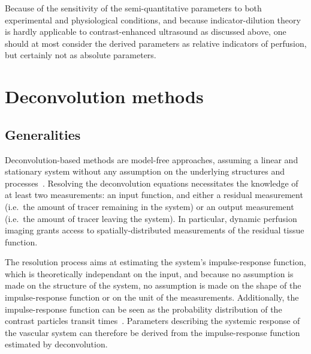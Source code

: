 Because of the sensitivity of the semi-quantitative parameters to both experimental and physiological conditions, and because indicator-dilution theory is hardly applicable to contrast-enhanced ultrasound as discussed above, one should at most consider the derived parameters as relative indicators of perfusion, but certainly not as absolute parameters.

\section{Deconvolution methods}
\label{sec:DeconvolutionMethods}
\subsection{Generalities}
Deconvolution-based methods are model-free approaches, assuming a linear and stationary system without any assumption on the underlying structures and processes~\cite{Lassen:1979tk}.
Resolving the deconvolution equations necessitates the knowledge of at least two measurements: an input function, and either a residual measurement (i.e.~the amount of tracer remaining in the system) or an output measurement (i.e.~the amount of tracer leaving the system).
In particular, dynamic perfusion imaging grants access to spatially-distributed measurements of the residual tissue function.

The resolution process aims at estimating the system's impulse-response function, which is theoretically independant on the input, and because no assumption is made on the structure of the system, no assumption is made on the shape of the impulse-response function or on the unit of the measurements.
Additionally, the impulse-response function can be seen as the probability distribution of the contrast particles transit times~\cite{Lassen:1979vj}.
Parameters describing the systemic response of the vascular system can therefore be derived from the impulse-response function estimated by deconvolution.

